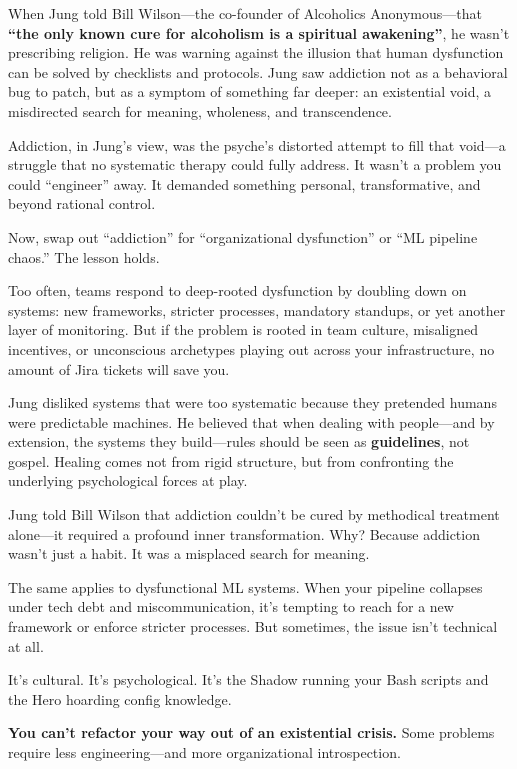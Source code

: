 \medskip

When Jung told Bill Wilson—the co-founder of Alcoholics Anonymous—that \textbf{``the only known cure for alcoholism is a spiritual awakening''}, he wasn’t prescribing religion. He was warning against the illusion that human dysfunction can be solved by checklists and protocols. Jung saw addiction not as a behavioral bug to patch, but as a symptom of something far deeper: an existential void, a misdirected search for meaning, wholeness, and transcendence.

Addiction, in Jung’s view, was the psyche’s distorted attempt to fill that void—a struggle that no systematic therapy could fully address. It wasn’t a problem you could ``engineer'' away. It demanded something personal, transformative, and beyond rational control.


Now, swap out ``addiction'' for ``organizational dysfunction'' or ``ML pipeline chaos.'' The lesson holds.

Too often, teams respond to deep-rooted dysfunction by doubling down on systems: new frameworks, stricter processes, mandatory standups, or yet another layer of monitoring. But if the problem is rooted in team culture, misaligned incentives, or unconscious archetypes playing out across your infrastructure, no amount of Jira tickets will save you.

Jung disliked systems that were too systematic because they pretended humans were predictable machines. He believed that when dealing with people—and by extension, the systems they build—rules should be seen as \textbf{guidelines}, not gospel. Healing comes not from rigid structure, but from confronting the underlying psychological forces at play.

\begin{tcolorbox}[
    title=Jung’s Warning: Not Every Problem Has a Systematic Fix,
    colback=gray!5,
    colframe=black,
    fonttitle=\bfseries,
    sharp corners=south,
    boxrule=0.5pt,
    enhanced,
    breakable
]
Jung told Bill Wilson that addiction couldn’t be cured by methodical treatment alone—it required a profound inner transformation. Why? Because addiction wasn’t just a habit. It was a misplaced search for meaning.

\medskip

The same applies to dysfunctional ML systems. When your pipeline collapses under tech debt and miscommunication, it’s tempting to reach for a new framework or enforce stricter processes. But sometimes, the issue isn’t technical at all.

\medskip

It’s cultural. It’s psychological. It’s the Shadow running your Bash scripts and the Hero hoarding config knowledge.

\medskip

\textbf{You can’t refactor your way out of an existential crisis.} Some problems require less engineering—and more organizational introspection.
\end{tcolorbox}

